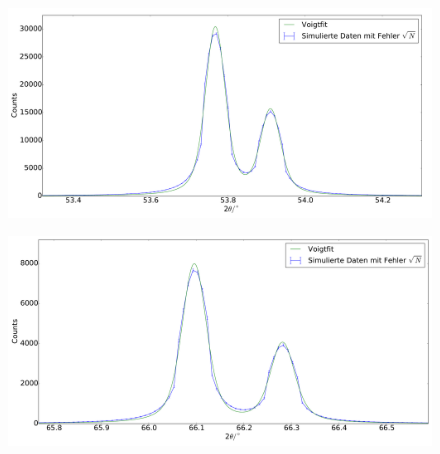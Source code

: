 \begin{figure}[H]
\begin{minipage}{.52\textwidth}
  \centering
  \includegraphics[scale=0.18]{Simulation_Germaniumpulver_3}
  \label{fig:pul_sim_ger_3}
\end{minipage}
\hspace{0.2cm}
\begin{minipage}{.52\textwidth}
  \centering
  \includegraphics[scale=0.18]{Simulation_Germaniumpulver_4}
  \label{fig:pul_sim_ger_4}
\end{minipage}
\end{figure}
